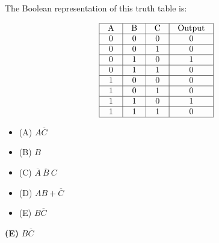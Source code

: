 

The Boolean representation of this truth table is:


$$\vbox{\offinterlineskip
\halign{\strut
\vrule \quad\hfil # \ \hfil & 
\vrule \quad\hfil # \ \hfil & 
\vrule \quad\hfil # \ \hfil & 
\vrule \quad\hfil # \ \hfil \vrule \cr
\noalign{\hrule}
%
A & B & C & Output \cr
%
\noalign{\hrule}
%
0 & 0 & 0 & 0 \cr
%
\noalign{\hrule}
%
0 & 0 & 1 & 0 \cr
%
\noalign{\hrule}
%
0 & 1 & 0 & 1 \cr
%
\noalign{\hrule}
%
0 & 1 & 1 & 0 \cr
%
\noalign{\hrule}
%
1 & 0 & 0 & 0 \cr
%
\noalign{\hrule}
%
1 & 0 & 1 & 0 \cr
%
\noalign{\hrule}
%
1 & 1 & 0 & 1 \cr
%
\noalign{\hrule}
%
1 & 1 & 1 & 0 \cr
%
\noalign{\hrule}
} %
}$$ %

\begin{itemize}
\item{(A)} $A \overline{C}$
\vskip 5pt 
\item{(B)} $B$
\vskip 5pt 
\item{(C)} $\overline{A} \> \overline{B} \> C$
\vskip 5pt 
\item{(D)} $AB + \overline{C}$
\vskip 5pt 
\item{(E)} $B \overline{C}$
\end{itemize}







{\bf (E)} $B \overline{C}$
 










